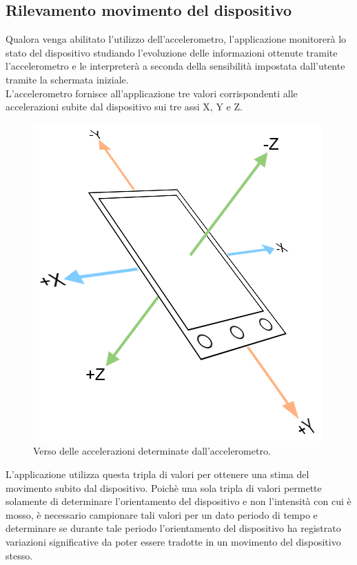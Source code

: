 \subsection{Rilevamento movimento del dispositivo}
Qualora venga abilitato l'utilizzo dell'accelerometro, l'applicazione monitorerà lo stato del dispositivo studiando l'evoluzione delle informazioni ottenute tramite l'accelerometro e le interpreterà a seconda della sensibilità impostata dall'utente tramite la schermata iniziale.\\

L'accelerometro fornisce all'applicazione tre valori corrispondenti alle accelerazioni subite dal dispositivo sui tre assi X, Y e Z.
\begin{figure}[!ht]
\begin{center}
\includegraphics[scale=.5]{./../wireless/resources/accelerometer.png}
\caption{Verso delle accelerazioni determinate dall'accelerometro.}
\label{fig:Accelerometro}
\end{center}
\end{figure}
L'applicazione utilizza questa tripla di valori per ottenere una stima del movimento subito dal dispositivo. Poichè una sola tripla di valori permette solamente di determinare l'orientamento del dispositivo e non l'intensità con cui è mosso, è necessario campionare tali valori per un dato periodo di tempo e determinare se durante tale periodo l'orientamento del dispositivo ha registrato variazioni significative da poter essere tradotte in un movimento del dispositivo stesso.\\

